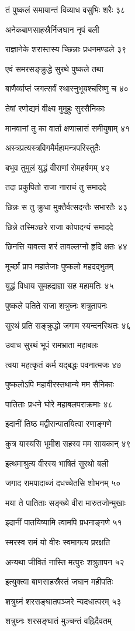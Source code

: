 तं पुष्कलं समायान्तं विव्याध वसुभिः शरैः ३८

अनेकबाणसाहस्रैर्निजघान नृपं बली

राज्ञानेके शरास्तस्य च्छिन्नाः प्रधनमण्डले ३९

एवं समरसङ्क्रुद्धे सुरथे पुष्कले तथा

बाणैर्व्याप्तं जगत्सर्वं स्थास्नुभूयश्चरिष्णु च ४०

तेषां रणोद्यमं वीक्ष्य मुमुहुः सुरसैनिकाः

मानवानां तु का वार्ता क्षणात्त्रासं समीयुषाम् ४१

अस्त्रप्रत्यस्त्रविगमैर्महामन्त्रपरिस्तुतैः

बभूव तुमुलं युद्धं वीराणां रोमहर्षणम् ४२

तदा प्रकुपितो राजा नाराचं तु समाददे

छिन्नः स तु क्रुधा मुक्तैर्वत्सदन्तैः सभारतैः ४३

छिन्ने तस्मिञ्छरे राजा कोपादन्यं समाददे

छिनत्ति यावत्स शरं तावल्लग्नो हृदि क्षतः ४४

मूर्च्छां प्राप महातेजाः पुष्कलो महदद्भुतम्

युद्धं विधाय सुमहद्राज्ञा सह महामतिः ४५

पुष्कले पतिते राजा शत्रुघ्नः शत्रुतापनः

सुरथं प्रति सङ्क्रुद्धो जगाम स्यन्दनस्थितः ४६

उवाच सुरथं भूपं रामभ्राता महाबलः

त्वया महत्कृतं कर्म यद्बद्धः पवनात्मजः ४७

पुष्कलोऽपि महावीरस्तथान्ये मम सैनिकाः

पातिताः प्रधने घोरे महाबलपराक्रमाः ४८

इदानीं तिष्ठ मद्वीरान्पातयित्वा रणाङ्गणे

कुत्र यास्यसि भूमीश सहस्व मम सायकान् ४९

इत्थमाश्रुत्य वीरस्य भाषितं सुरथो बली

जगाद रामपादाब्जं दधच्चेतसि शोभनम् ५०

मया ते पातिताः सङ्ख्ये वीरा मारुतजोन्मुखाः

इदानीं पातयिष्यामि त्वामपि प्रधनाङ्गणे ५१

स्मरस्व रामं यो वीरः स्वमागत्य प्ररक्षति

अन्यथा जीवितं नास्ति मत्पुरः शत्रुतापन ५२

इत्युक्त्वा बाणसाहस्रैस्तं जघान महीपतिः

शत्रुघ्नं शरसङ्घातपञ्जरे न्यदधात्परम् ५३

शत्रुघ्नः शरसङ्घातं मुञ्चन्तं वह्निदैवतम्

